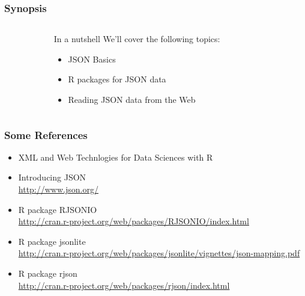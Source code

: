 \documentclass{beamer}\usepackage[]{graphicx}\usepackage[]{color}
\begin{document}

\begin{frame}
\frametitle{Synopsis}

\begin{columns}[t]
\begin{column}{0.1\textwidth}
\end{column}
\begin{column}{0.8\textwidth}

\begin{block}{In a nutshell}
We'll cover the following topics:
\begin{itemize}
 \item JSON Basics
 \item R packages for JSON data
 \item Reading JSON data from the Web
\end{itemize}
\end{block}

\end{column}
\begin{column}{0.1\textwidth}
\end{column}
\end{columns}

\end{frame}


\begin{frame}
\frametitle{Some References}

\begin{itemize}
 \item XML and Web Technlogies for Data Sciences with R \\
 \item Introducing JSON \\
 {\scriptsize \url{http://www.json.org/}}
 \item R package RJSONIO \\
 {\scriptsize \url{http://cran.r-project.org/web/packages/RJSONIO/index.html}}
 \item R package jsonlite \\
{\scriptsize \url{http://cran.r-project.org/web/packages/jsonlite/vignettes/json-mapping.pdf}}
 \item R package rjson \\
{\scriptsize \url{http://cran.r-project.org/web/packages/rjson/index.html}}
\end{itemize}

\end{frame}
\end{document}
